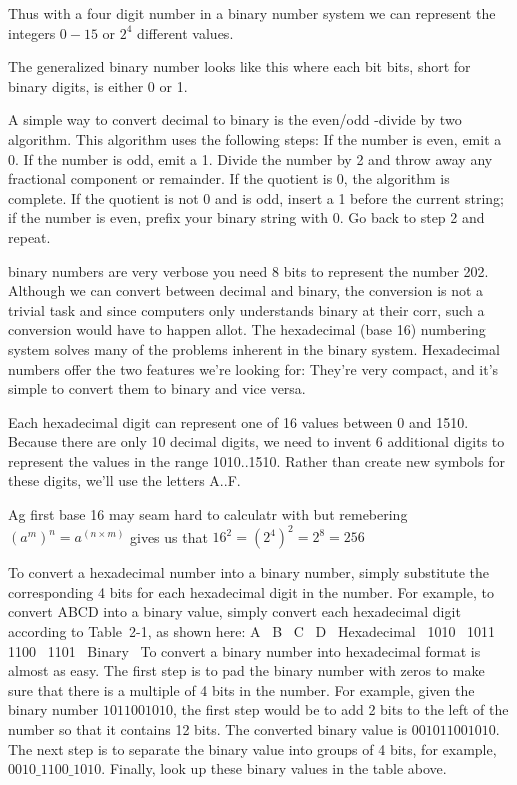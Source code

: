 Thus with a four digit number in a binary number system we can represent the integers $0-15$ or $2^4$ different values. 

The generalized binary number looks like this where each bit bits, short for binary digits, is either 0 or 1.

A simple way to convert decimal to binary is the even/odd -divide by two algorithm. This algorithm uses the following steps: If the number is even, emit a 0. If the number is odd, emit a 1. Divide the number by 2 and throw away any fractional component or remainder. If the quotient is 0, the algorithm is complete. If the quotient is not 0 and is odd, insert a 1 before the current string; if the number is even, prefix your binary string with 0. Go back to step 2 and repeat.

binary numbers are very verbose you need 8 bits to represent the number 202. Although we can convert between decimal and binary, the conversion is not a trivial task and since computers only understands binary at their corr, such a conversion would have to happen allot. The hexadecimal (base 16) numbering system solves many of the problems inherent in the binary system. Hexadecimal numbers offer the two features we're looking for: They're very compact, and it's simple to convert them to binary and vice versa. 

Each hexadecimal digit can represent one of 16 values between 0 and 1510. Because there are only 10 decimal digits, we need to invent 6 additional digits to represent the values in the range 1010..1510. Rather than create new symbols for these digits, we'll use the letters A..F. 

Ag first base 16 may seam hard to calculatr with but remebering $(a^m)^n = a^(n \times m)$ gives us that $16^2 = (2^4)^2 = 2^8 = 256$


To convert a hexadecimal number into a binary number, simply substitute the corresponding 4 bits for each hexadecimal digit in the number. For example, to convert ABCD into a binary value, simply convert each hexadecimal digit according to Table 2-1, as shown here: A  B  C  D  Hexadecimal  1010  1011  1100  1101  Binary  To convert a binary number into hexadecimal format is almost as easy. The first step is to pad the binary number with zeros to make sure that there is a multiple of 4 bits in the number. For example, given the binary number $1011001010$, the first step would be to add 2 bits to the left of the number so that it contains 12 bits. The converted binary value is $001011001010$. The next step is to separate the binary value into groups of 4 bits, for example, $0010\_1100\_1010$. Finally, look up these binary values in the table above.

